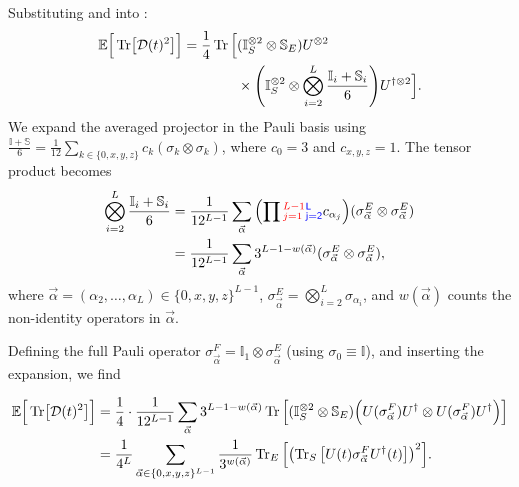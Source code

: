 Substituting  and
 into :
\begin{align}
\mathbb{E}\Big[\Tr[\mathcal{D}(t)^2]\Big]
= \frac{1}{4} \Tr \Big[ & (\mathbb{I}_S^{\otimes 2} \otimes \mathbb{S}_E)
U^{\otimes 2} \nonumber \\
& \times \qty( \mathbb{I}_S^{\otimes 2} \otimes
\bigotimes_{i=2}^L \frac{\mathbb{I}_i + \mathbb{S}_i}{6} )
U^{\dagger \otimes 2}
\Big].
\end{align}
We expand the averaged projector in the Pauli basis using
$\frac{\mathbb{I} + \mathbb{S}}{6} =
\frac{1}{12} \sum_{k \in \{0,x,y,z\}} c_k (\sigma_k \otimes \sigma_k)$,
where $c_0 = 3$ and $c_{x,y,z} = 1$. The tensor product becomes
\begin{align}
\bigotimes_{i=2}^L \frac{\mathbb{I}_i + \mathbb{S}_i}{6}
&= \frac{1}{12^{L-1}} \sum_{\vec{\alpha}}
\qty(\prod {\protect\color{red} \scriptsize _{j=1}^{L-1} }  {\protect\color{blue} \sf _{j=2}^{L} } c_{\alpha_j})
(\sigma_{\vec{\alpha}}^E \otimes \sigma_{\vec{\alpha}}^E)
\nonumber \\
&= \frac{1}{12^{L-1}} \sum_{\vec{\alpha}}
3^{L-1-w(\vec{\alpha})}
(\sigma_{\vec{\alpha}}^E \otimes \sigma_{\vec{\alpha}}^E),
\end{align}
where $\vec{\alpha} = (\alpha_2, \dots, \alpha_L) \in \{0,x,y,z\}^{L-1}$,
$\sigma_{\vec{\alpha}}^E = \bigotimes_{i=2}^L \sigma_{\alpha_i}$,
and $w(\vec{\alpha})$ counts the non-identity operators in $\vec{\alpha}$.

Defining the full Pauli operator
$\sigma_{\vec{\alpha}}^F = \mathbb{I}_1 \otimes \sigma_{\vec{\alpha}}^E$
(using $\sigma_0 \equiv \mathbb{I}$), and inserting the
expansion, we find
\begin{widetext}
\begin{align}
\mathbb{E}\Big[\Tr[\mcD(t)^2]\Big]
&= \frac{1}{4} \cdot \frac{1}{12^{L-1}} \sum_{\vec{\alpha}} 3^{L-1-w(\vec{\alpha})}
\Tr \Big[ (\mathbb{I}_S^{\otimes 2} \otimes \mathbb{S}_E)
\Big( U (\sigma_{\vec{\alpha}}^F) U^\dagger
\otimes U (\sigma_{\vec{\alpha}}^F) U^\dagger \Big) \Big]
\nonumber \\
%
&= \frac{1}{4^{L}} \sum_{\vec{\alpha} \in \{0,x,y,z\}^{L-1}}
\frac{1}{3^{w(\vec{\alpha})}}
\Tr_E \Big[ \qty( \Tr_S \big[U(t)
\sigma_{\vec{\alpha}}^F U^\dagger(t) \big] )^2 \Big].
\label{eq:app:final_result}
\end{align}
\end{widetext}